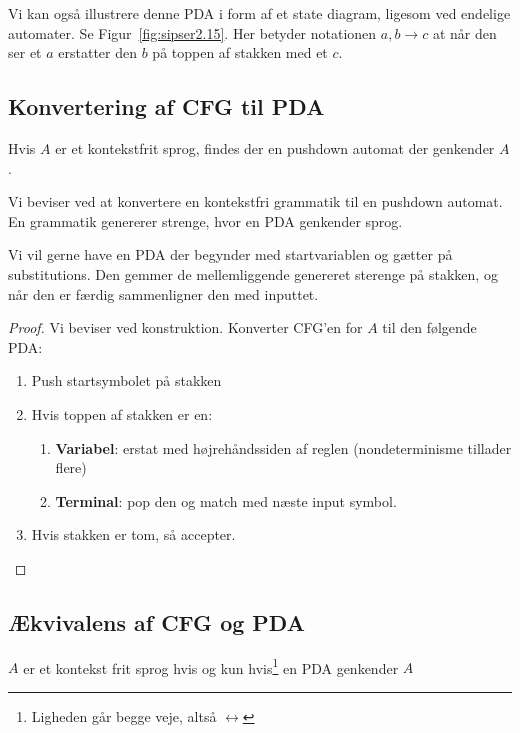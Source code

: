 \begin{example}[$\{0^{n}1^{n} | n \ge 0\}$]
	Vi kan også illustrere denne PDA i form af et state diagram, ligesom ved endelige automater. Se Figur~\ref{fig:sipser2.15}. Her betyder notationen $a, b \rightarrow c$ at når den ser et $a$ erstatter den $b$ på toppen af stakken med et $c$.

\end{example}


\subsection{Konvertering af CFG til PDA}%
\label{subsec:pdacfgconvert}
\begin{theorem}
	\label{teo:pdacfgconvert}
	Hvis $A$ er et kontekstfrit sprog, findes der en pushdown automat der genkender $A$.
\end{theorem}

Vi beviser ved at konvertere en kontekstfri grammatik til en pushdown automat. En grammatik genererer strenge, hvor en PDA genkender sprog.

Vi vil gerne have en PDA der begynder med startvariablen og gætter på substitutions. Den gemmer de mellemliggende genereret sterenge på stakken, og når den er færdig sammenligner den med inputtet.


\begin{proof}
	Vi beviser ved konstruktion. Konverter CFG'en for $A$ til den følgende PDA:
	\begin{enumerate}
		\item Push startsymbolet på stakken
		\item Hvis toppen af stakken er en:
		      \begin{enumerate}
			      \item \textbf{Variabel}: erstat med højrehåndssiden af reglen (nondeterminisme tillader flere)
			      \item \textbf{Terminal}: pop den og match med næste input symbol.
		      \end{enumerate}
		\item Hvis stakken er tom, så accepter.
	\end{enumerate}
\end{proof}


\subsection{Ækvivalens af CFG og PDA}%
\label{subsec:cfgpdaequiv}

\begin{theorem}
	\label{teo:cfgpdaquiv}
	$A$ er et kontekst frit sprog hvis og kun hvis\footnote{Ligheden går begge veje, altså $\leftrightarrow$} en PDA genkender $A$
\end{theorem}

